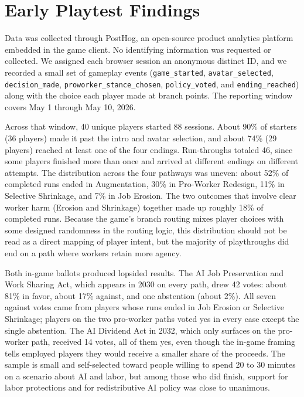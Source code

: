 \section{Early Playtest Findings}

Data was collected through PostHog, an open-source product analytics platform embedded in the game client. No identifying information was requested or collected. We assigned each browser session an anonymous distinct ID, and we recorded a small set of gameplay events (\texttt{game\_started}, \texttt{avatar\_selected}, \texttt{decision\_made}, \texttt{proworker\_stance\_chosen}, \texttt{policy\_voted}, and \texttt{ending\_reached}) along with the choice each player made at branch points. The reporting window covers May 1 through May 10, 2026.

Across that window, 40 unique players started 88 sessions. About 90\% of starters (36 players) made it past the intro and avatar selection, and about 74\% (29 players) reached at least one of the four endings. Run-throughs totaled 46, since some players finished more than once and arrived at different endings on different attempts. The distribution across the four pathways was uneven: about 52\% of completed runs ended in Augmentation, 30\% in Pro-Worker Redesign, 11\% in Selective Shrinkage, and 7\% in Job Erosion. The two outcomes that involve clear worker harm (Erosion and Shrinkage) together made up roughly 18\% of completed runs. Because the game's branch routing mixes player choices with some designed randomness in the routing logic, this distribution should not be read as a direct mapping of player intent, but the majority of playthroughs did end on a path where workers retain more agency.

Both in-game ballots produced lopsided results. The AI Job Preservation and Work Sharing Act, which appears in 2030 on every path, drew 42 votes: about 81\% in favor, about 17\% against, and one abstention (about 2\%). All seven against votes came from players whose runs ended in Job Erosion or Selective Shrinkage; players on the two pro-worker paths voted yes in every case except the single abstention. The AI Dividend Act in 2032, which only surfaces on the pro-worker path, received 14 votes, all of them yes, even though the in-game framing tells employed players they would receive a smaller share of the proceeds. The sample is small and self-selected toward people willing to spend 20 to 30 minutes on a scenario about AI and labor, but among those who did finish, support for labor protections and for redistributive AI policy was close to unanimous.
